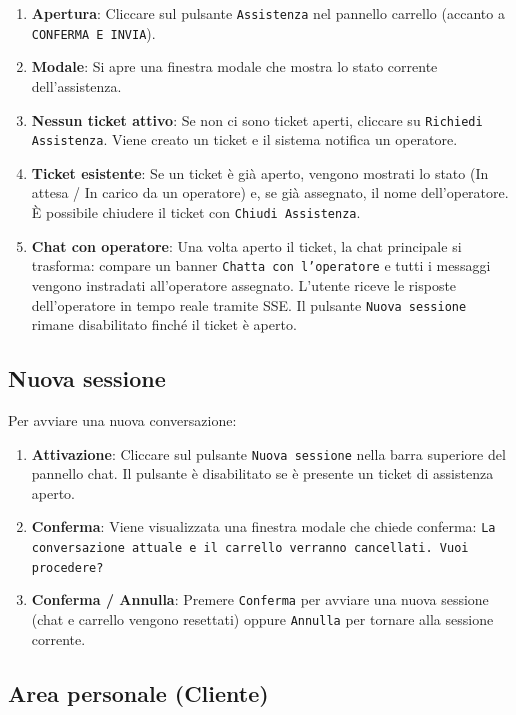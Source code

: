 \documentclass[a4paper, 11pt, oneside]{scrartcl}
\begin{document}
\begin{enumerate}
    \item \textbf{Apertura}: Cliccare sul pulsante \texttt{Assistenza} nel pannello carrello (accanto a \texttt{CONFERMA E INVIA}).
    \item \textbf{Modale}: Si apre una finestra modale che mostra lo stato corrente dell'assistenza.
    \item \textbf{Nessun ticket attivo}: Se non ci sono ticket aperti, cliccare su \texttt{Richiedi Assistenza}. Viene creato un ticket e il sistema notifica un operatore.
    \item \textbf{Ticket esistente}: Se un ticket \`e gi\`a aperto, vengono mostrati lo stato (In attesa / In carico da un operatore) e, se gi\`a assegnato, il nome dell'operatore. \`E possibile chiudere il ticket con \texttt{Chiudi Assistenza}.
    \item \textbf{Chat con operatore}: Una volta aperto il ticket, la chat principale si trasforma: compare un banner \texttt{Chatta con l'operatore} e tutti i messaggi vengono instradati all'operatore assegnato. L'utente riceve le risposte dell'operatore in tempo reale tramite SSE. Il pulsante \texttt{Nuova sessione} rimane disabilitato finché il ticket \`e aperto.
\end{enumerate}

\subsection{Nuova sessione}

Per avviare una nuova conversazione:

\begin{enumerate}
    \item \textbf{Attivazione}: Cliccare sul pulsante \texttt{Nuova sessione} nella barra superiore del pannello chat. Il pulsante \`e disabilitato se \`e presente un ticket di assistenza aperto.
    \item \textbf{Conferma}: Viene visualizzata una finestra modale che chiede conferma: \texttt{La conversazione attuale e il carrello verranno cancellati. Vuoi procedere?}
    \item \textbf{Conferma / Annulla}: Premere \texttt{Conferma} per avviare una nuova sessione (chat e carrello vengono resettati) oppure \texttt{Annulla} per tornare alla sessione corrente.
\end{enumerate}

\subsection{Area personale (Cliente)}
\end{document}
